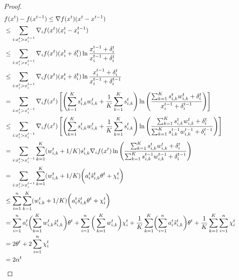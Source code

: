 \begin{proof}
\begin{align}
&f(x^{t}) - f(x^{t-1}) \leq \nabla f(x^{t}) (x^{t} - x^{t-1}) \notag \\
%
&\leq \sum_{i: x_{i}^{t} > x_{i}^{t-1}} \nabla_{i} f(x^{t})(x_{i}^{t} - x_{i}^{t-1}) &&  \notag \\
%
&\leq \sum_{i: x_{i}^{t} > x_{i}^{t-1}} \nabla_{i} f(x^{t}) (x_{i}^{t} + \delta_{i}^{t})\ln \frac{x_{i}^{t-1} + \delta_{i}^{t}}{x_{i}^{t-1} + \delta_{i}^{t}} \\
%
&\leq \sum_{i: x_{i}^{t} > x_{i}^{t-1}} \nabla_{i} f(x^{t})(x_{i}^{t} + \delta_{i}^{t}) \ln \frac{x_{i}^{t-1} + \delta_{i}^{t}}{x_{i}^{t-1} + \delta_{i}^{t-1}} \\
%
&= \sum_{i: x_{i}^{t} > x_{i}^{t-1}} \nabla_{i} f(x^{t})\left[ \left(\sum_{k=1}^{K}  s_{i,k}^{t} w_{i,k}^{t} + \frac{1}{K} \sum_{k=1}^{K} s_{i,k}^{t} \right)
			\ln \left(\frac{ \sum_{k=1}^{K}  s_{i,k}^{t} w_{i,k}^{t} + \delta_{i}^{t}}{x_{i}^{t-1} + \delta_{i}^{t-1}}  \right) \right]\\
%
&\leq \sum_{i: x_{i}^{t} > x_{i}^{t-1}} \nabla_{i} f(x^{t})\left[ \left(\sum_{k=1}^{K}  s_{i,k}^{t} w_{i,k}^{t} + \frac{1}{K} \sum_{k=1}^{K} s_{i,k}^{t} \right)
			\ln \left(\frac{ \sum_{k=1}^{K}  s_{i,k}^{t} w_{i,k}^{t} + \delta_{i}^{t}}{\sum_{k=1}^{K}  s_{i,k}^{t-1} w_{i,k}^{t-1} + \delta_{i}^{t-1}}  \right) \right]\\
%
&= \sum_{i: x_{i}^{t} > x_{i}^{t-1}} \sum_{k=1}^{K} (w_{i,k}^{t} + 1/K) s_{i,k}^{t}\nabla_{i} f(x^{t})
			\ln \left(\frac{ \sum_{k=1}^{K} s_{i,k}^{t} w_{i,k}^{t}  + \delta_{i}^{t}}{\sum_{k=1}^{K}  s_{i,k}^{t-1} w_{i,k}^{t-1}  + \delta_{i}^{t-1}}  \right) \notag \\
%
&=  \sum_{i: x_{i}^{t} > x_{i}^{t-1}} \sum_{k=1}^{K} (w_{i,k}^{t} + 1/K) \biggl( a_{i}^{t} \hat{s}_{i,k}^{t} \theta^{t} + \chi_{i}^{t} \biggr)  \\
%
&\leq \sum_{i=1}^{n} \sum_{k=1}^{K} (w_{i,k}^{t} + 1/K) \biggl( a_{i}^{t} \hat{s}_{i,k}^{t} \theta^{t} + \chi_{i}^{t} \biggr) \notag \\
%
&= \sum_{i=1}^{n} a_{i}^{t} \biggl(\sum_{k=1}^{K} w_{i,k}^{t} \hat{s}_{i,k}^{t} \biggr) \theta^t + \sum_{i=1}^{n} \bigg( \sum_{k=1}^{K} w_{i,k}^{t} \biggr) \chi_{i}^{t}
+ \frac{1}{K}  \sum_{k=1}^{K} \biggl( \sum_{i=1}^{n} a_{i}^{t}  \hat{s}_{i,k}^{t}  \biggr) \theta^t + \frac{1}{K} \sum_{k=1}^{K} \sum_{i=1}^{n} \chi_{i}^{t} 		\notag \\
%
&= 2 \theta^{t} + 2\sum_{i=1}^{n} \chi_{i}^{t} \\
%
&= 2\alpha^{t}	\notag
\end{align}

\end{proof}
